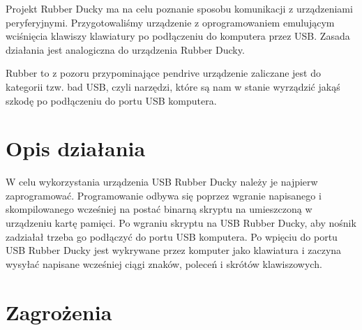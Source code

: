 \documentclass{article}
\begin{document}
Projekt Rubber Ducky ma na celu poznanie sposobu komunikacji z urządzeniami peryferyjnymi. Przygotowaliśmy urządzenie z oprogramowaniem emulującym wciśnięcia klawiszy klawiatury po podłączeniu do komputera przez USB. Zasada działania jest analogiczna do urządzenia Rubber Ducky. 

Rubber to z pozoru przypominające pendrive urządzenie zaliczane jest do kategorii tzw. bad USB, czyli narzędzi, które są nam w stanie wyrządzić jakąś szkodę po podłączeniu do portu USB komputera.

\section{Opis działania}

W celu wykorzystania urządzenia USB Rubber Ducky należy je najpierw zaprogramować. Programowanie odbywa się poprzez wgranie napisanego i skompilowanego wcześniej na postać binarną skryptu na umieszczoną w urządzeniu kartę pamięci. Po wgraniu skryptu na USB Rubber Ducky, aby nośnik zadziałał trzeba go podłączyć do portu USB komputera. Po wpięciu do portu USB Rubber Ducky jest wykrywane przez komputer jako klawiatura i zaczyna wysyłać napisane wcześniej ciągi znaków, poleceń i skrótów klawiszowych.
\section{Zagrożenia}
\end{document}
